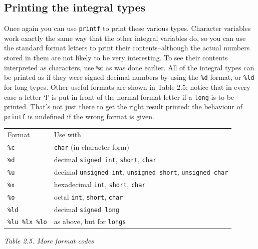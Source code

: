   

  \subsection{Printing the integral types}
   

   Once again you can use \texttt{printf} to print these various types.
    Character variables work exactly the same way that the other integral
    variables do, so you can use the standard format letters to print their
    contents--although the actual numbers stored in them are not likely
    to be very interesting. To see their contents interpreted as characters,
    use \texttt{\%c} as was done earlier. All of the integral types can be
    printed as if they were signed decimal numbers by using the
    \texttt{\%d} format, or \texttt{\%ld} for long types. Other useful
    formats are shown in Table 2.5; notice that in every case a
    letter `l' is put in front of the normal format letter if a
    \texttt{long} is to be printed. That's not just there to get the right
    result printed: the behaviour of \texttt{printf} is undefined if the
    wrong format is given.


   \begin{tabular}{lp{\textwidth}}
     Format & Use with
    \\

     \texttt{\%c} & \texttt{char} (in character form)
    \\

     \texttt{\%d} & decimal \texttt{signed int}, \texttt{short},
      \texttt{char}
    \\

     \texttt{\%u} & decimal \texttt{unsigned int}, \texttt{unsigned short},
      \texttt{unsigned char}
    \\

     \texttt{\%x} & hexadecimal \texttt{int}, \texttt{short},
      \texttt{char}
    \\

     \texttt{\%o} & octal \texttt{int}, \texttt{short}, \texttt{char}
    \\

     \texttt{\%ld} & decimal \texttt{signed long}
    \\

     \texttt{\%lu \%lx \%lo} & as above, but for \texttt{longs}
    \\
\end{tabular}

\begin{center}\textit{Table 2.5. More format codes}\end{center}


